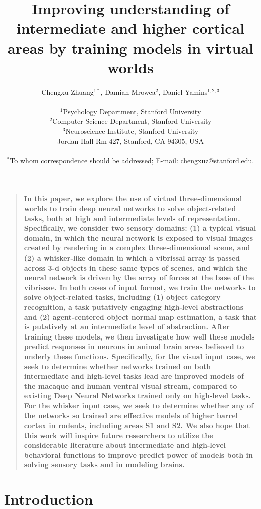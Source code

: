 \documentclass[12pt]{article}
\title{Improving understanding of intermediate and higher cortical areas by training models in virtual worlds}
\author
{Chengxu Zhuang$^{1\ast}$, Damian Mrowca$^{2}$, Daniel Yamins$^{1,2,3}$\\
\\
\normalsize{$^{1}$Psychology Department,  Stanford University}\\
\normalsize{$^{2}$Computer Science Department,  Stanford University}\\
\normalsize{$^{3}$Neuroscience Institute,  Stanford University}\\
\normalsize{Jordan Hall Rm 427, Stanford, CA 94305, USA}\\
\\
\normalsize{$^\ast$To whom correspondence should be addressed; E-mail: chengxuz@stanford.edu.}
}
\date{}
\newenvironment{sciabstract}{%
\begin{quote} \bf}
{\end{quote}}
\begin{document}

\baselineskip24pt


\maketitle


\begin{sciabstract}
In this paper, we explore the use of virtual three-dimensional worlds to train deep neural networks to solve object-related tasks, both at high and intermediate levels of representation.
Specifically, we consider two sensory domains: (1) a typical visual domain, in which the neural network is exposed to visual images created by rendering in a complex three-dimensional scene, and (2) a whisker-like domain in which a vibrissal array is passed across 3-d objects in these same types of scenes, and which the neural network is driven by the array of forces at the base of the vibrissae.
In both cases of input format, we train the networks to solve object-related tasks, including (1) object category recognition, a task putatively engaging high-level abstractions and (2) agent-centered object normal map estimation, a task that is putatively at an intermediate level of abstraction.
After training these models, we then investigate how well these models predict responses in neurons in animal brain areas believed to underly these functions. Specifically, for the visual input case, we seek to determine whether networks trained on both intermediate and high-level tasks lead are improved models of the macaque and human ventral visual stream, compared to existing Deep Neural Networks trained only on high-level tasks. For the whisker input case, we seek to determine whether any of the networks so trained are effective models of higher barrel cortex in rodents, including areas S1 and S2. We also hope that this work will inspire future researchers to utilize the considerable literature about intermediate and high-level behavioral functions to improve predict power of models both in solving sensory tasks and in modeling brains.

\end{sciabstract}

\section*{Introduction}
\end{document}
